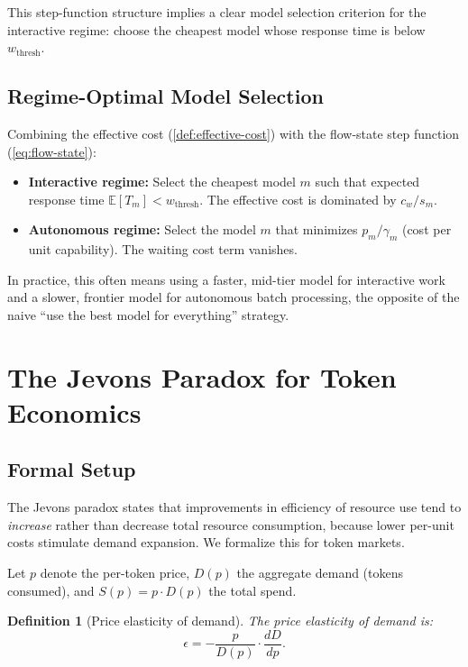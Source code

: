 \documentclass[11pt, a4paper, logo, copyright]{googledeepmind}
\newtheorem{definition}{Definition}[section]
\begin{document}
This step-function structure implies a clear model selection criterion for the interactive regime: choose the cheapest model whose response time is below $w_{\text{thresh}}$.

\subsection{Regime-Optimal Model Selection}

Combining the effective cost (\cref{def:effective-cost}) with the flow-state step function (\cref{eq:flow-state}):

\begin{itemize}[nosep]
    \item \textbf{Interactive regime:} Select the cheapest model $m$ such that expected response time $\mathbb{E}[T_m] < w_{\text{thresh}}$. The effective cost is dominated by $c_w / s_m$.
    \item \textbf{Autonomous regime:} Select the model $m$ that minimizes $p_m / \gamma_m$ (cost per unit capability). The waiting cost term vanishes.
\end{itemize}

In practice, this often means using a faster, mid-tier model for interactive work and a slower, frontier model for autonomous batch processing, the opposite of the naive ``use the best model for everything'' strategy.


\section{The Jevons Paradox for Token Economics}\label{sec:jevons}

\subsection{Formal Setup}

The Jevons paradox \citep{jevons1865} states that improvements in efficiency of resource use tend to \emph{increase} rather than decrease total resource consumption, because lower per-unit costs stimulate demand expansion. We formalize this for token markets.

Let $p$ denote the per-token price, $D(p)$ the aggregate demand (tokens consumed), and $S(p) = p \cdot D(p)$ the total spend.

\begin{definition}[Price elasticity of demand]\label{def:elasticity}
The \emph{price elasticity of demand} is:
\begin{equation}\label{eq:elasticity}
    \epsilon = -\frac{p}{D(p)} \cdot \frac{dD}{dp}.
\end{equation}
\end{definition}
\end{document}
